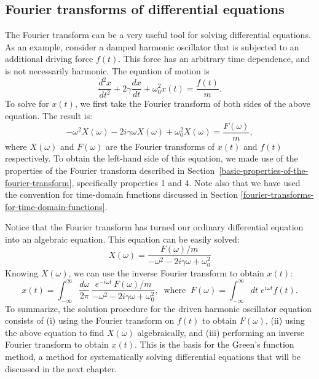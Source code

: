 \documentclass[10pt,a4paper]{article}
\begin{document}
\subsection{Fourier transforms of differential equations}
\label{fourier-transforms-of-differential-equations}

The Fourier transform can be a very useful tool for solving
differential equations. As an example, consider a damped harmonic
oscillator that is subjected to an additional driving force $f(t)$.
This force has an arbitrary time dependence, and is not necessarily
harmonic. The equation of motion is
\begin{equation}
\frac{d^2 x}{dt^2} + 2\gamma \frac{dx}{dt} + \omega_0^2 x(t) = \frac{f(t)}{m}.
\end{equation}
To solve for $x(t)$, we first take the Fourier transform of both sides
of the above equation. The result is:
\begin{equation}
- \omega^2 X(\omega) - 2 i\gamma \omega X(\omega) + \omega_0^2 X(\omega) = \frac{F(\omega)}{m},
\end{equation}
where $X(\omega)$ and $F(\omega)$ are the Fourier transforms of $x(t)$
and $f(t)$ respectively. To obtain the left-hand side of this
equation, we made use of the properties of the Fourier transform
described in Section~\ref{basic-properties-of-the-fourier-transform},
specifically properties 1 and 4. Note also that we have used the
convention for time-domain functions discussed in Section
\ref{fourier-transforms-for-time-domain-functions}.

Notice that the Fourier transform has turned our ordinary differential
equation into an algebraic equation. This equation can be easily solved:
\begin{equation}
X(\omega) = \frac{F(\omega)/m}{- \omega^2 - 2 i\gamma \omega + \omega_0^2}
\end{equation}
Knowing $X(\omega)$, we can use the inverse Fourier transform to
obtain $x(t)$:
\begin{equation}
x(t) = \int_{-\infty}^\infty \frac{d\omega}{2\pi} \, \frac{e^{-i\omega t}\, F(\omega)/m}{- \omega^2 - 2 i\gamma \omega + \omega_0^2}, \;\; \mathrm{where}\;\; F(\omega) = \int_{-\infty}^\infty dt\; e^{i\omega t} f(t).
\end{equation}
To summarize, the solution procedure for the driven harmonic
oscillator equation consists of (i) using the Fourier transform on
$f(t)$ to obtain $F(\omega)$, (ii) using the above equation to find
$X(\omega)$ algebraically, and (iii) performing an inverse Fourier
transform to obtain $x(t)$. This is the basis for the Green's function
method, a method for systematically solving differential equations
that will be discussed in the next chapter.
\end{document}
